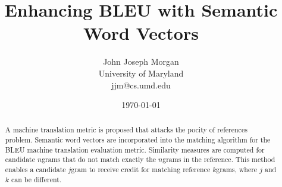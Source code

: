 \documentclass{article}
\title{Enhancing BLEU  with Semantic Word Vectors}
\author{John Joseph Morgan \\
University of Maryland \\
jjm@cs.umd.edu
}
\date{\today}
\begin{document}
\maketitle
\begin{abstract}
A machine translation metric is proposed that attacks the pocity of references problem. 
Semantic word vectors are incorporated into the matching algorithm for the BLEU machine translation evaluation metric. 
Similarity measures are computed for candidate $n$grams that do not match exactly the $n$grams in the reference. 
This method enables a candidate $j$gram to receive credit for matching reference $k$grams, where $j$ and $k$ can be different. 


\end{abstract}
\end{document}
